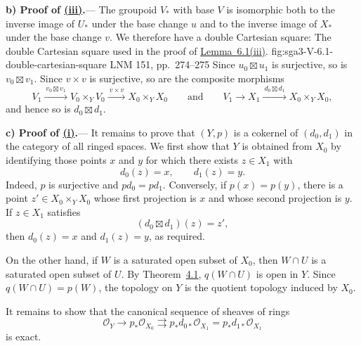 

\medskip
{}\label{par:sga3-V-6-b}%
\noindent\textbf{b) Proof of \hyperref[lem:sga3-V-6.1-iii]{(iii)}.}---%
The groupoid \(V_\ast\) with base \(V\) is isomorphic both to the
inverse image of \(U_\ast\) under the base change \(u\) and to the
inverse image of \(X_\ast\) under the base change \(v\). We therefore
have a double Cartesian square:
  {The double Cartesian square used in the proof of \hyperref[lem:sga3-V-6.1-iii]{Lemma~6.1(iii)}.}
  {fig:sga3-V-6.1-double-cartesian-square}
  {LNM 151, pp.~274--275}
Since \(u_0\boxtimes u_1\) is surjective, so is
\(v_0\boxtimes v_1\). Since \(v\times v\) is surjective, so are the
composite morphisms
\[
  V_1\xrightarrow{\ v_0\boxtimes v_1\ }V_0\times_YV_0
  \xrightarrow{\ v\times v\ }X_0\times_YX_0
  \qquad\text{and}\qquad
  V_1\longrightarrow X_1\xrightarrow{\ d_0\boxtimes d_1\ }X_0\times_YX_0,
\]
and hence so is \(d_0\boxtimes d_1\).

\medskip
{}\label{par:sga3-V-6-c}%
\noindent\textbf{c) Proof of \hyperref[lem:sga3-V-6.1-i]{(i)}.}---%
It remains to prove that \((Y,p)\) is a cokernel of \((d_0,d_1)\) in
the category of all ringed spaces. We first show that \(Y\) is
obtained from \(X_0\) by identifying those points \(x\) and \(y\) for
which there exists \(z\in X_1\) with
\[
  d_0(z)=x,\qquad d_1(z)=y.
\]
Indeed, \(p\) is surjective and \(p d_0=p d_1\). Conversely, if
\(p(x)=p(y)\), there is a point \(z'\in X_0\times_Y X_0\) whose first
projection is \(x\) and whose second projection is \(y\). If
\(z\in X_1\) satisfies
\[
  (d_0\boxtimes d_1)(z)=z',
\]
then \(d_0(z)=x\) and \(d_1(z)=y\), as required.

On the other hand, if \(W\) is a saturated open subset of \(X_0\),
then \(W\cap U\) is a saturated open subset of \(U\). By
Theorem~\hyperref[thm:sga3-V-4.1]{4.1}, \(q(W\cap U)\) is open in
\(Y\). Since \(q(W\cap U)=p(W)\), the topology on \(Y\) is the
quotient topology induced by \(X_0\).

It remains to show that the canonical sequence of sheaves of rings
\begin{equation}
  \mathcal O_Y
  \longrightarrow p_\ast\mathcal O_{X_0}
  \rightrightarrows
  p_\ast d_{0\ast}\mathcal O_{X_1}
  =
  p_\ast d_{1\ast}\mathcal O_{X_1}
  \label{eq:sga3-V-6.1-sheaf-exactness}
\end{equation}
is exact.
